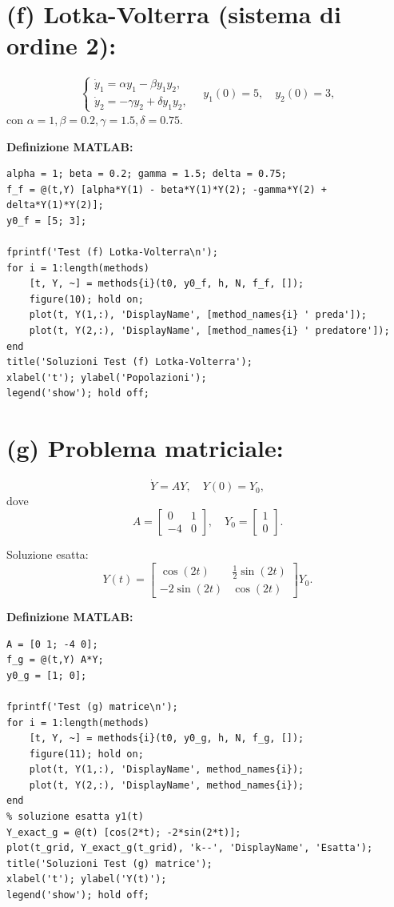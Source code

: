 \documentclass[12pt,a4paper]{article}
\begin{document}
\section*{(f) Lotka-Volterra (sistema di ordine 2):}  
\[
\begin{cases}
\dot{y}_1 = \alpha y_1 - \beta y_1 y_2, \\
\dot{y}_2 = -\gamma y_2 + \delta y_1 y_2,
\end{cases}
\quad y_1(0) = 5, \quad y_2(0) = 3,
\]
con \(\alpha=1, \beta=0.2, \gamma=1.5, \delta=0.75\).

\noindent
\textbf{Definizione MATLAB:}
\begin{lstlisting}
alpha = 1; beta = 0.2; gamma = 1.5; delta = 0.75;
f_f = @(t,Y) [alpha*Y(1) - beta*Y(1)*Y(2); -gamma*Y(2) + delta*Y(1)*Y(2)];
y0_f = [5; 3];

fprintf('Test (f) Lotka-Volterra\n');
for i = 1:length(methods)
    [t, Y, ~] = methods{i}(t0, y0_f, h, N, f_f, []);
    figure(10); hold on;
    plot(t, Y(1,:), 'DisplayName', [method_names{i} ' preda']);
    plot(t, Y(2,:), 'DisplayName', [method_names{i} ' predatore']);
end
title('Soluzioni Test (f) Lotka-Volterra');
xlabel('t'); ylabel('Popolazioni');
legend('show'); hold off;
\end{lstlisting}

\section*{(g) Problema matriciale:}  
\[
\dot{Y} = A Y, \quad Y(0) = Y_0,
\]
dove  
\[
A = \begin{bmatrix} 0 & 1 \\ -4 & 0 \end{bmatrix}, \quad Y_0 = \begin{bmatrix} 1 \\ 0 \end{bmatrix}.
\]

\noindent
Soluzione esatta:  
\[
Y(t) = \begin{bmatrix}
\cos(2t) & \frac{1}{2} \sin(2t) \\
-2 \sin(2t) & \cos(2t)
\end{bmatrix} Y_0.
\]

\noindent
\textbf{Definizione MATLAB:}
\begin{lstlisting}
A = [0 1; -4 0];
f_g = @(t,Y) A*Y;
y0_g = [1; 0];

fprintf('Test (g) matrice\n');
for i = 1:length(methods)
    [t, Y, ~] = methods{i}(t0, y0_g, h, N, f_g, []);
    figure(11); hold on;
    plot(t, Y(1,:), 'DisplayName', method_names{i});
    plot(t, Y(2,:), 'DisplayName', method_names{i});
end
% soluzione esatta y1(t)
Y_exact_g = @(t) [cos(2*t); -2*sin(2*t)];
plot(t_grid, Y_exact_g(t_grid), 'k--', 'DisplayName', 'Esatta');
title('Soluzioni Test (g) matrice');
xlabel('t'); ylabel('Y(t)');
legend('show'); hold off;
\end{lstlisting}
\end{document}
